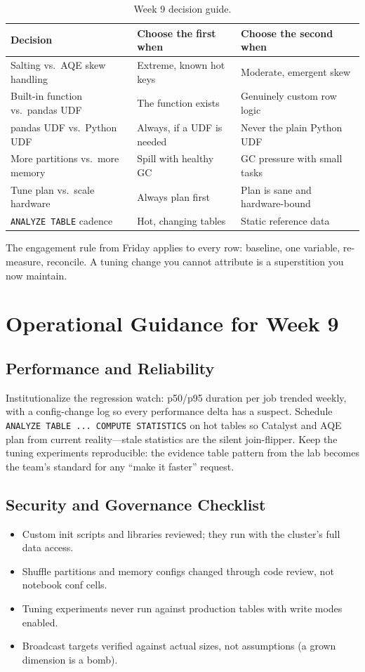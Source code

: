 \begin{table}[H]
\centering
\small
\begin{tabular}{@{}p{3.4cm}p{4.4cm}p{4.6cm}@{}}
\toprule
\textbf{Decision} & \textbf{Choose the first when} & \textbf{Choose the second when} \\
\midrule
Salting vs.\ AQE skew handling & Extreme, known hot keys & Moderate, emergent skew \\
Built-in function vs.\ pandas UDF & The function exists & Genuinely custom row logic \\
pandas UDF vs.\ Python UDF & Always, if a UDF is needed & Never the plain Python UDF \\
More partitions vs.\ more memory & Spill with healthy GC & GC pressure with small tasks \\
Tune plan vs.\ scale hardware & Always plan first & Plan is sane and hardware-bound \\
\texttt{ANALYZE TABLE} cadence & Hot, changing tables & Static reference data \\
\bottomrule
\end{tabular}
\caption{Week 9 decision guide.}
\label{tab:ch9-decisions}
\end{table}

The engagement rule from Friday applies to every row: baseline, one variable, re-measure, reconcile. A tuning change you cannot attribute is a superstition you now maintain.

\section{Operational Guidance for Week 9}
%
\subsection{Performance and Reliability}
Institutionalize the regression watch: p50/p95 duration per job trended weekly, with a config-change log so every performance delta has a suspect. Schedule \texttt{ANALYZE TABLE ... COMPUTE STATISTICS} on hot tables so Catalyst and AQE plan from current reality---stale statistics are the silent join-flipper. Keep the tuning experiments reproducible: the evidence table pattern from the lab becomes the team's standard for any ``make it faster'' request.

\subsection{Security and Governance Checklist}
\begin{itemize}
    \item Custom init scripts and libraries reviewed; they run with the cluster's full data access.
    \item Shuffle partitions and memory configs changed through code review, not notebook conf cells.
    \item Tuning experiments never run against production tables with write modes enabled.
    \item Broadcast targets verified against actual sizes, not assumptions (a grown dimension is a bomb).
\end{itemize}

